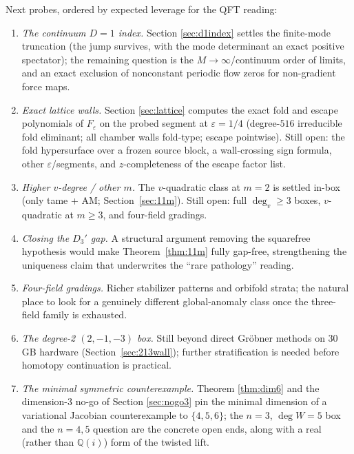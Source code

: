 \documentclass[11pt]{article}
\theoremstyle{definition}
\theoremstyle{remark}
\newcommand{\Q}{\mathbb{Q}}
\begin{document}
Next probes, ordered by expected leverage for the QFT reading:

\begin{enumerate}
\item \emph{The continuum $D=1$ index.} Section \ref{sec:d1index}
 settles the finite-mode truncation (the jump survives, with the mode
 determinant an exact positive spectator); the remaining question is
 the $M\to\infty$/continuum order of limits, and an exact exclusion
 of nonconstant periodic flow zeros for non-gradient force maps.
\item \emph{Exact lattice walls.} Section \ref{sec:lattice} computes
 the exact fold and escape polynomials of $F_\varepsilon$ on the
 probed segment at $\varepsilon=1/4$ (degree-$516$ irreducible fold
 eliminant; all chamber walls fold-type; escape pointwise). Still
 open: the fold hypersurface over a frozen source block, a
 wall-crossing sign formula, other $\varepsilon$/segments, and
 $z$-completeness of the escape factor list.
\item \emph{Higher $v$-degree / other $m$.} The $v$-quadratic class at
 $m=2$ is settled in-box (only tame + AM; Section~\ref{sec:11m}).
 Still open: full $\deg_v\ge 3$ boxes, $v$-quadratic at $m\ge 3$, and
 four-field gradings.
\item \emph{Closing the $D_3'$ gap.} A structural argument removing the
 squarefree hypothesis would make Theorem~\ref{thm:11m} fully
 gap-free, strengthening the uniqueness claim that underwrites the
 ``rare pathology'' reading.
\item \emph{Four-field gradings.} Richer stabilizer patterns and
 orbifold strata; the natural place to look for a genuinely different
 global-anomaly class once the three-field family is exhausted.
\item \emph{The degree-2 $(2,-1,-3)$ box.} Still beyond direct Gr\"obner
 methods on 30\,GB hardware (Section~\ref{sec:213wall}); further
 stratification is needed before homotopy continuation is practical.
\item \emph{The minimal symmetric counterexample.} Theorem
 \ref{thm:dim6} and the dimension-3 no-go of Section \ref{sec:nogo3}
 pin the minimal dimension of a variational Jacobian counterexample to
 $\{4,5,6\}$; the $n=3$, $\deg W=5$ box and the $n=4,5$ question are
 the concrete open ends, along with a real (rather than $\Q(i)$) form
 of the twisted lift.
\end{enumerate}

\end{document}
